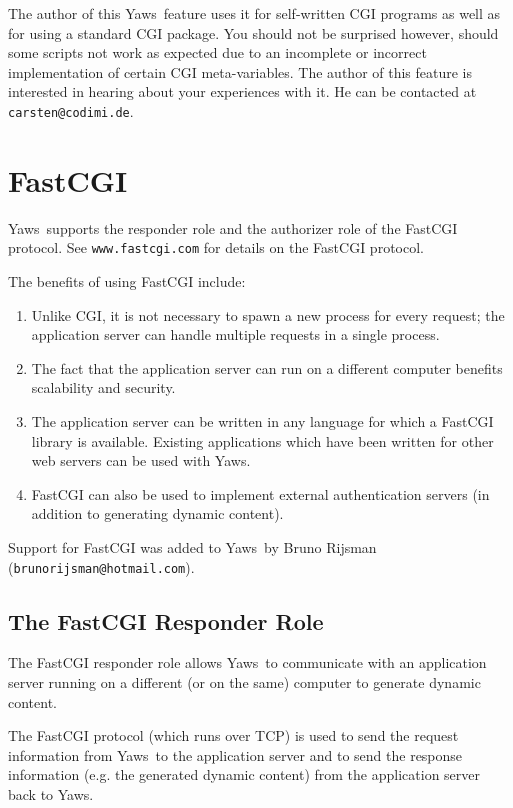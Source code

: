 \documentclass[11pt,oneside,english]{book}
\newcommand{\Yaws}            %
        {{\sc Yaws}}
\begin{document}
The author of this \Yaws\  feature uses it for self-written CGI programs
as well as for using a standard CGI package.  You should not be
surprised however, should some scripts not work as expected due to an
incomplete or incorrect implementation of certain CGI meta-variables.
The author of this feature is interested in hearing about your
experiences with it.  He can be contacted at \verb+carsten@codimi.de+.

\chapter{FastCGI}

\Yaws\  supports the responder role and the authorizer role of the
FastCGI protocol. See \verb+www.fastcgi.com+ for details on the
FastCGI protocol.

The benefits of using FastCGI include:
\begin{enumerate}
\item Unlike CGI, it is not necessary to spawn a new process for
every request; the application server can handle multiple requests
in a single process.
\item The fact that the application server can run on a different
computer benefits scalability and security.
\item The application server can be written in any language for
which a FastCGI library is available. Existing applications
which have been written for other web servers can be used with
\Yaws{}.
\item FastCGI can also be used to implement external authentication
servers (in addition to generating dynamic content).
\end{enumerate}

Support for FastCGI was added to \Yaws\  by Bruno Rijsman
(\verb+brunorijsman@hotmail.com+).

\section{The FastCGI Responder Role}

The FastCGI responder role allows \Yaws\  to communicate with an
application server running on a different (or on the same) computer
to generate dynamic content.

The FastCGI protocol (which runs over TCP) is used to send the request
information from \Yaws\  to the application server and to send the
response information (e.g. the generated dynamic content) from
the application server back to \Yaws{}.
\end{document}
